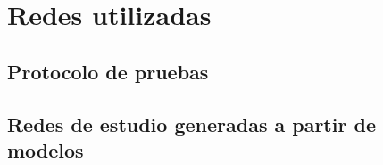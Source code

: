 \section{Redes utilizadas}

\subsection{Protocolo de pruebas}


\subsection{Redes de estudio generadas a partir de modelos}